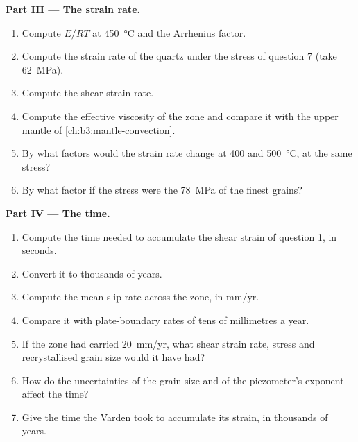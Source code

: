 \begin{problem}
\medskip\noindent\textbf{Part III --- The strain rate.}
\begin{enumerate}[resume]
  \item Compute $E/RT$ at \qty{450}{\celsius} and the Arrhenius factor.
  \item Compute the strain rate of the quartz under the stress of question 7
        (take \qty{62}{MPa}).
  \item Compute the shear strain rate.
  \item Compute the effective viscosity of the zone and compare it with the
        upper mantle of \cref{ch:b3:mantle-convection}.
  \item By what factors would the strain rate change at 400 and
        \qty{500}{\celsius}, at the same stress?
  \item By what factor if the stress were the \qty{78}{MPa} of the finest
        grains?
\end{enumerate}

\medskip\noindent\textbf{Part IV --- The time.}
\begin{enumerate}[resume]
  \item Compute the time needed to accumulate the shear strain of question 1,
        in seconds.
  \item Convert it to thousands of years.
  \item Compute the mean slip rate across the zone, in \unit{mm/yr}.
  \item Compare it with plate-boundary rates of tens of millimetres a year.
  \item If the zone had carried \qty{20}{mm/yr}, what shear strain rate, stress
        and recrystallised grain size would it have had?
  \item How do the uncertainties of the grain size and of the piezometer's
        exponent affect the time?
  \item Give the time the Varden  took to accumulate its strain, in
        thousands of years.
\end{enumerate}
\end{problem}
